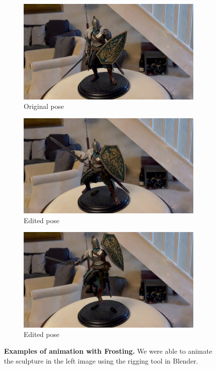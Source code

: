\begin{figure}[tb]
  \centering
  \begin{subfigure}{0.31\linewidth}
 \includegraphics[trim={4cm 0 5cm 0},clip,width=\linewidth]{images/edition/faraam0_rgb_166.jpg}
 \caption{Original pose}
  \end{subfigure}
  \hfill
  \begin{subfigure}{0.31\linewidth}
  \includegraphics[trim={4cm 0 5cm 0},clip,width=\linewidth]{images/edition/faraam0_rgb_64.jpg}
  \caption{Edited pose}
  \end{subfigure}
  \hfill
  \begin{subfigure}{0.31\linewidth}
  \includegraphics[trim={4cm 0 5cm 0},clip,width=\linewidth]{images/edition/faraam0_rgb_64_1.jpg}
  \caption{Edited pose}
  \end{subfigure}
  \caption{
  \textbf{Examples of animation with Frosting.} We were able to animate the sculpture in the left image using the rigging tool in Blender.
  }
  \label{fig:edition-examples}
\end{figure}